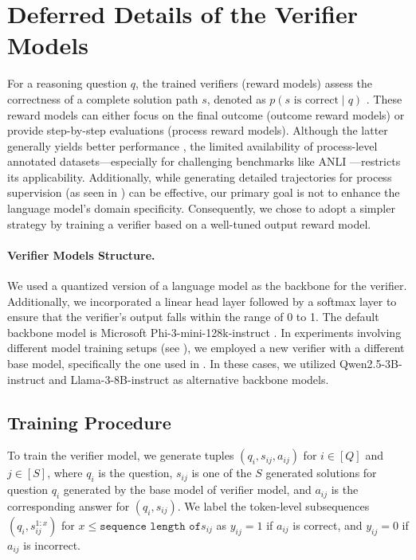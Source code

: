 \section{Deferred Details of the  Verifier Models}
\label{appendix:verifier}
For a reasoning question $q$, the trained verifiers (reward models) assess the correctness of a complete solution path $s$, denoted as \(p(s \text{ is correct} \mid q)\) \citep{cobbe2021training, uesato2022solving, lightman2023let}. These reward models can either focus on the final outcome (outcome reward models) or provide step-by-step evaluations (process reward models). Although the latter generally yields better performance \citep{lightman2023let}, the limited availability of process-level annotated datasets—especially for challenging benchmarks like ANLI \citep{nie2019adversarial}—restricts its applicability. Additionally, while generating detailed trajectories for process supervision (as seen in \citet{wang2024math}) can be effective, our primary goal is not to enhance the language model's domain specificity. Consequently, we chose to adopt a simpler strategy by training a verifier based on a well-tuned output reward model. 

\paragraph{Verifier Models Structure.}
We used a quantized version of a language model as the backbone for the verifier. Additionally, we incorporated a linear head layer followed by a softmax layer to ensure that the verifier’s output falls within the range of 0 to 1. The default backbone model is Microsoft Phi-3-mini-128k-instruct \citep{abdin2024phi}. In experiments involving different model training setups (see ), we employed a new verifier with a different base model, specifically the one used in . In these cases, we utilized Qwen2.5-3B-instruct \citep{yang2024qwen2} and Llama-3-8B-instruct \citep{dubey2024llama} as alternative backbone models.

\subsection{Training Procedure}
To train the verifier model, we generate tuples \( (q_i, s_{ij}, a_{ij}) \) for \( i \in [Q] \) and \( j \in [S] \), where \( q_i \) is the question, \( s_{ij} \) is one of the \( S \) generated solutions for question \( q_i \) generated by the base model of verifier model, and \( a_{ij} \) is the corresponding answer for \( (q_i, s_{ij}) \).  We label the token-level subsequences \( (q_i, s_{ij}^{1:x}) \) for \( x \leq \texttt{sequence length of} s_{ij} \) as \( y_{ij} = 1 \) if \( a_{ij} \) is correct, and \( y_{ij} = 0 \) if \( a_{ij} \) is incorrect. 

